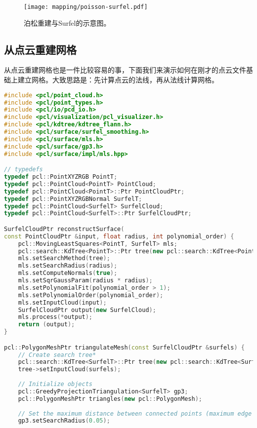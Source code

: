 \begin{figure}[!htp]
	\centering
	\texttt{[image: mapping/poisson-surfel.pdf]}
	\caption{泊松重建与Surfel的示意图。}
	\label{fig:poisson-surfel}
\end{figure}

\subsection{从点云重建网格}
从点云重建网格也是一件比较容易的事，下面我们来演示如何在刚才的点云文件基础上建立网格。大致思路是：先计算点云的法线，再从法线计算网格。

\begin{lstlisting}[language=c++,caption=slambook2/ch12/dense_RGBD/surfel_mapping.cpp]
#include <pcl/point_cloud.h>
#include <pcl/point_types.h>
#include <pcl/io/pcd_io.h>
#include <pcl/visualization/pcl_visualizer.h>
#include <pcl/kdtree/kdtree_flann.h>
#include <pcl/surface/surfel_smoothing.h>
#include <pcl/surface/mls.h>
#include <pcl/surface/gp3.h>
#include <pcl/surface/impl/mls.hpp>

// typedefs
typedef pcl::PointXYZRGB PointT;
typedef pcl::PointCloud<PointT> PointCloud;
typedef pcl::PointCloud<PointT>::Ptr PointCloudPtr;
typedef pcl::PointXYZRGBNormal SurfelT;
typedef pcl::PointCloud<SurfelT> SurfelCloud;
typedef pcl::PointCloud<SurfelT>::Ptr SurfelCloudPtr;

SurfelCloudPtr reconstructSurface(
const PointCloudPtr &input, float radius, int polynomial_order) {
    pcl::MovingLeastSquares<PointT, SurfelT> mls;
    pcl::search::KdTree<PointT>::Ptr tree(new pcl::search::KdTree<PointT>);
    mls.setSearchMethod(tree);
    mls.setSearchRadius(radius);
    mls.setComputeNormals(true);
    mls.setSqrGaussParam(radius * radius);
    mls.setPolynomialFit(polynomial_order > 1);
    mls.setPolynomialOrder(polynomial_order);
    mls.setInputCloud(input);
    SurfelCloudPtr output(new SurfelCloud);
    mls.process(*output);
    return (output);
}

pcl::PolygonMeshPtr triangulateMesh(const SurfelCloudPtr &surfels) {
    // Create search tree*
    pcl::search::KdTree<SurfelT>::Ptr tree(new pcl::search::KdTree<SurfelT>);
    tree->setInputCloud(surfels);
    
    // Initialize objects
    pcl::GreedyProjectionTriangulation<SurfelT> gp3;
    pcl::PolygonMeshPtr triangles(new pcl::PolygonMesh);
    
    // Set the maximum distance between connected points (maximum edge length)
    gp3.setSearchRadius(0.05);
    

\end{lstlisting}
